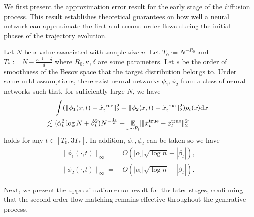 We first present the approximation error result for the early stage of the diffusion process. This result establishes theoretical guarantees on how well a neural network can approximate the first and second order flows during the initial phases of the trajectory evolution.

\begin{theorem}\label{thm:secon_order_small_t:informal}
    Let $N$ be a value associated with sample size $n$. Let $T_0 := N^{-R_0}$ and $T_* := N - \frac{\kappa^{-1} - \delta}{d}$ where $R_0, \kappa, \delta$ are some parameters.  Let $s$ be the order of smoothness of the Besov space that the target distribution belongs to.
    Under some mild assumptions, there exist neural networks $\phi_{1},\phi_2$ from a class of neural networks such that, for sufficiently large $N$, we have
\begin{align*}
    &~ \int (\|\phi_1(x, t) - \dot{x}_t^\mathrm{true}\|_2^2 + \|\phi_2(x, t) - \ddot{x}_t^\mathrm{true}\|_2^2) p_t(x) \mathrm{d} x \\ 
    \lesssim &~ (\dot{\alpha}_t^2 \log N + \dot{\beta}_t^2 ) N^{- \frac{2s}{d}} +
    \operatorname*{{\mathbb{E}}}_{x \sim P_t}[\|\dot{x}^\mathrm{true}_t - \ddot{x}^\mathrm{true}_t\|_2^2]
\end{align*}
    holds for any $t \in [T_{0}, 3T_{*}]$. In addition, $\phi_1, \phi_2$ can be taken so we have
    \begin{align*}
         \|\phi_1(\cdot,t) \|_\infty = &~ O(  |\dot{\alpha}_t | \sqrt{\log n} +  |\dot{\beta}_t |), \\ \|\phi_2(\cdot,t) \|_\infty = &~ O(  |\dot{\alpha}_t | \sqrt{\log n} +  |\dot{\beta}_t |).
    \end{align*}
\end{theorem}

Next, we present the approximation error result for the later stages, confirming that the second-order flow matching remains effective throughout the generative process.

